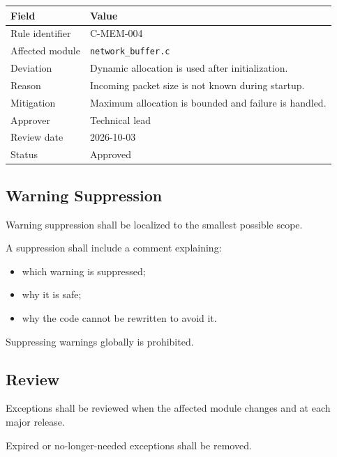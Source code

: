 \begin{longtable}{p{} p{}}
\toprule
Field & Value \\
\midrule
Rule identifier & C-MEM-004 \\
Affected module & \texttt{network\_buffer.c} \\
Deviation & Dynamic allocation is used after initialization. \\
Reason & Incoming packet size is not known during startup. \\
Mitigation & Maximum allocation is bounded and failure is handled. \\
Approver & Technical lead \\
Review date & 2026-10-03 \\
Status & Approved \\
\bottomrule
\end{longtable}

\subsection{Warning Suppression}

Warning suppression shall be localized to the smallest possible scope.

A suppression shall include a comment explaining:

\begin{itemize}
	\item which warning is suppressed;
	\item why it is safe;
	\item why the code cannot be rewritten to avoid it.
\end{itemize}

Suppressing warnings globally is prohibited.

\subsection{Review}

Exceptions shall be reviewed when the affected module changes and at each major release.

Expired or no-longer-needed exceptions shall be removed.
